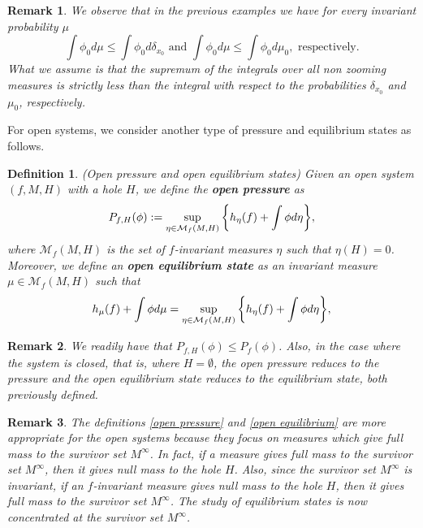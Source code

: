 \documentclass[12pt,a4paper]{amsart}
\theoremstyle{plain}
\newtheorem{definition}{Definition}[subsection]
\newtheorem{remark}{Remark}[subsection]
\begin{document}
\begin{remark}
	We observe that in the previous examples we have for every invariant probability $\mu$
	\[
	\int \phi_{0} d\mu \leq \int \phi_{0} d\delta_{x_{0}} \,\, \text{and} \,\, \int \phi_{0} d\mu \leq \int \phi_{0} d\mu_{0}, \,\, \text{respectively}.
	\]
	What we assume is that the supremum of the integrals over all non zooming measures is strictly less than the integral with respect to the probabilities $\delta_{x_{0}}$ and $\mu_{0}$, respectively.
\end{remark}

For open systems, we consider another type of pressure and equilibrium states as follows.

\begin{definition}(Open pressure and open equilibrium states) \label{openpressure}
	Given an open system $(f,M,H)$ with a hole $H$, we define the \textbf{\textit{open pressure}} as
	\begin{equation}\label{open pressure}
		\displaystyle P_{f,H}(\phi) : = \sup_{\eta \in \mathcal{M}_{f}(M,H)} \bigg{\{} h_{\eta}(f) + \int \phi d\eta \bigg{\}},
	\end{equation}
	where $\mathcal{M}_{f}(M,H)$ is the set of $f$-invariant measures $\eta$ such that $\eta(H) = 0$. Moreover, we define an \textbf{\textit{open equilibrium state}} as an invariant measure $\mu \in \mathcal{M}_{f}(M,H)$ such that
	\begin{equation}\label{open equilibrium}
		\displaystyle h_{\mu}(f) + \int \phi d\mu = \sup_{\eta \in \mathcal{M}_{f}(M,H)} \bigg{\{} h_{\eta}(f) + \int \phi d\eta \bigg{\}},
	\end{equation} 	
\end{definition}

\begin{remark}
	We readily have that $P_{f,H}(\phi) \leq P_{f}(\phi)$. Also, in the case where the system is closed, that is, where $H = \emptyset$, the open pressure reduces to the pressure and the open equilibrium state reduces to the equilibrium state, both previously defined.
\end{remark}

\begin{remark}
	The definitions \ref{open pressure} and \ref{open equilibrium} are more appropriate for the open systems because they focus on measures which give full mass to the survivor set $M^{\infty}$. In fact, if a measure gives full mass to the survivor set $M^{\infty}$, then it gives null mass to the hole $H$. Also, since the survivor set $M^{\infty}$ is invariant, if an $f$-invariant measure gives null mass to the hole $H$, then it gives full mass to the survivor set $M^{\infty}$. The study of equilibrium states is now concentrated at the survivor set $M^{\infty}$.
\end{remark}
\end{document}
